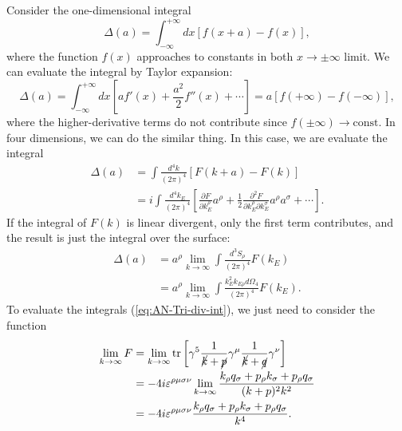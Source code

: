 \documentclass[aps,prb,superscriptaddress,nofootinbib]{revtex4}
\def \tr{\operatorname{tr}}
\begin{document}
Consider the one-dimensional integral
\begin{equation}
	\Delta(a) = \int^{+\infty}_{-\infty} dx \left[f(x+a)-f(x)\right],
\end{equation}
where the function $f(x)$ approaches to constants in both $x \rightarrow \pm\infty$ limit.
We can evaluate the integral by Taylor expansion:
\begin{equation}
	\Delta(a) = \int^{+\infty}_{-\infty} dx \left[af'(x)+\frac{a^2}{2}f''(x)+\cdots\right]
	= a\left[f(+\infty)-f(-\infty)\right],
\end{equation}
where the higher-derivative terms do not contribute since $f(\pm\infty)\rightarrow \text{const}$. 
In four dimensions, we can do the similar thing.
In this case, we are evaluate the integral
\begin{equation}
\begin{aligned}
	\Delta(a) 
	&= \int \frac{d^4k}{(2\pi)^4} \left[F(k+a)-F(k)\right] \\
	&= i\int \frac{d^4k_E}{(2\pi)^4} \left[\frac{\partial F}{\partial k_E^\rho} a^\rho + \frac{1}{2} \frac{\partial^2 F}{\partial k_E^\rho \partial k_E^\sigma} a^\rho a^\sigma + \cdots\right].
\end{aligned}
\end{equation}
If the integral of $F(k)$ is linear divergent, only the first term contributes, and the result is just the integral over the surface:
\begin{equation}
\begin{aligned}
	\Delta(a) &= a^\rho \lim_{k\rightarrow \infty} \int \frac{d^3 S_\rho}{(2\pi)^4} F(k_E) \\
	&= a^\rho \lim_{k\rightarrow \infty} \int \frac{k^2_E k_{E\rho} d \Omega_4}{(2\pi)^4} F(k_E).
\end{aligned}
\end{equation}
To evaluate the integrals (\ref{eq:AN-Tri-div-int}), we just need to consider the function
\begin{equation}
\begin{aligned}
	\lim_{k\rightarrow \infty} F 
	&= \lim_{k\rightarrow \infty} \tr\left[\gamma^{5} \frac{1}{\cancel k + \cancel p} \gamma^\mu \frac{1}{\cancel k+\cancel q}\gamma^{\nu}\right] \\
	&= -4i \varepsilon^{\rho\mu\sigma\nu} \lim_{k\rightarrow \infty} \frac{k_\rho q_\sigma + p_\rho k_\sigma + p_\rho q_\sigma}{(k+p)^2 k^2} \\
	&= -4i \varepsilon^{\rho\mu\sigma\nu} \frac{k_\rho q_\sigma + p_\rho k_\sigma + p_\rho q_\sigma}{k^4}.
\end{aligned}
\end{equation}
\end{document}
